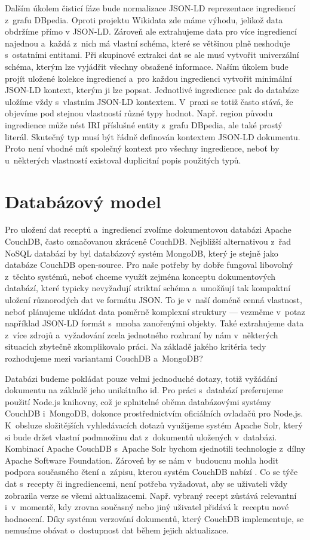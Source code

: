 Dalším úkolem čisticí fáze bude normalizace JSON-LD reprezentace ingrediencí z~grafu DBpedia. Oproti projektu Wikidata zde máme výhodu, jelikož data obdržíme přímo v JSON-LD. Zároveň ale extrahujeme data pro více ingrediencí najednou a~každá z~nich má vlastní schéma, které se většinou plně neshoduje s~ostatními entitami. Při skupinové extrakci dat se ale musí vytvořit univerzální schéma, kterým lze vyjádřit všechny obsažené informace. Naším úkolem bude projít uložené kolekce ingrediencí a~pro každou ingredienci vytvořit minimální JSON-LD kontext, kterým ji lze popsat. Jednotlivé ingredience pak do databáze uložíme vždy s~vlastním JSON-LD kontextem. V~praxi se totiž často stává, že objevíme pod stejnou vlastností různé typy hodnot. Např. region původu ingredience může nést IRI příslušné entity z~grafu DBpedia, ale také prostý literál. Skutečný typ musí být řádně definován kontextem JSON-LD dokumentu. Proto není vhodné mít společný kontext pro všechny ingredience, neboť by u~některých vlastností existoval duplicitní popis použitých typů.

\section{Databázový model}

Pro uložení dat receptů a~ingrediencí zvolíme dokumentovou databázi Apache CouchDB, často označovanou zkráceně CouchDB. Nejbližší alternativou z~řad NoSQL databází by byl databázový systém MongoDB, který je stejně jako databáze CouchDB open-source. Pro naše potřeby by dobře fungoval libovolný z~těchto systémů, neboť chceme využít zejména konceptu dokumentových databází, které typicky nevyžadují striktní schéma a~umožňují tak kompaktní uložení různorodých dat ve formátu JSON. To je v~naší doméně cenná vlastnost, neboť plánujeme ukládat data poměrně komplexní struktury --- vezměme v~potaz například JSON-LD formát s~mnoha zanořenými objekty. Také extrahujeme data z~více zdrojů a~vyžadování zcela jednotného rozhraní by nám v~některých situacích zbytečně zkomplikovalo práci. Na základě jakého kritéria tedy rozhodujeme mezi variantami CouchDB a~MongoDB?

Databázi budeme pokládat pouze velmi jednoduché dotazy, totiž vyžádání dokumentu na základě jeho unikátního id. Pro práci s~databází preferujeme použití Node.js knihovny, což je splnitelné oběma databázovými systémy CouchDB i~MongoDB, dokonce prostřednictvím oficiálních ovladačů pro Node.js. K~obsluze složitějších vyhledávacích dotazů využijeme systém Apache Solr, který si bude držet vlastní podmnožinu dat z~dokumentů uložených v~databázi. Kombinací Apache CouchDB s~Apache Solr bychom sjednotili technologie z~dílny Apache Software Foundation. Zároveň by se nám v~budoucnu mohla hodit podpora současného čtení a~zápisu, kterou systém CouchDB nabízí \citep{mongodb-vs-couchdb}. Co se týče dat s~recepty či ingrediencemi, není potřeba vyžadovat, aby se uživateli vždy zobrazila verze se všemi aktualizacemi. Např. vybraný recept zůstává relevantní i~v~momentě, kdy zrovna současný nebo jiný uživatel přidává k~receptu nové hodnocení. Díky systému verzování dokumentů, který CouchDB implementuje, se nemusíme obávat o~dostupnost dat během jejich aktualizace.


